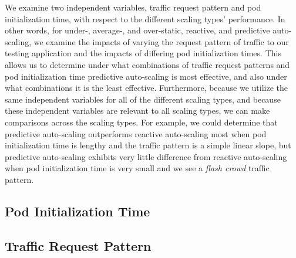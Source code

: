 We examine two independent variables, traffic request pattern and pod
initialization time, with respect to the different scaling types' performance.
In other words, for under-, average-, and over-static, reactive, and predictive
auto-scaling, we examine the impacts of varying the request pattern of traffic
to our testing application and the impacts of differing pod initialization
times. This allows us to determine under what combinations of traffic request
patterns and pod initialization time predictive auto-scaling is most effective,
and also under what combinations it is the least effective. Furthermore, because
we utilize the same independent variables for all of the different scaling
types, and because these independent variables are relevant to all scaling
types, we can make comparisons across the scaling types. For example, we could
determine that predictive auto-scaling outperforms reactive auto-scaling most
when pod initialization time is lengthy and the traffic pattern is a simple
linear slope, but predictive auto-scaling exhibits very little difference from
reactive auto-scaling when pod initialization time is very small and we see a
\textit{flash crowd} traffic pattern.

\subsection{Pod Initialization Time}



\subsection{Traffic Request Pattern}


